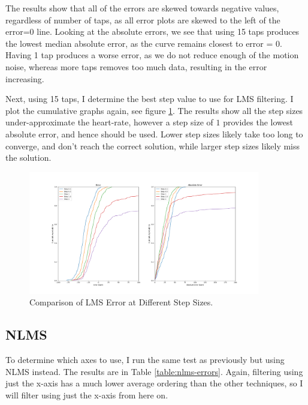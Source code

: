 \documentclass[12pt,a4paper,twoside,openright]{report}
\begin{document}
The results show that all of the errors are skewed towards negative values,
regardless of number of taps, as all error plots are skewed to the left of the error=0
line. Looking at the absolute errors, we see that
using 15 taps produces the lowest median absolute error, as the curve remains
closest to error = 0. Having 1 tap produces a worse error, as we do not reduce
enough of the motion noise, whereas more taps removes too much data, resulting
in the error increasing.

Next, using 15 taps, I determine the best step value to use for LMS filtering.
I plot the cumulative graphs again, see figure \ref{fig:lms-medium-step}. The
results show all the step sizes under-approximate the heart-rate, however a
step size of $1$ provides the lowest absolute error, and hence should be used.
Lower step sizes likely take too long to converge, and don't reach the correct
solution, while larger step sizes likely miss the solution.

\begin{figure}[H]
	\centerline{\includegraphics[width=0.9\textwidth]{figs/lms-steps-error-medium-noise.png}}
	\caption{Comparison of LMS Error at Different Step Sizes.}
	\label{fig:lms-medium-step}
\end{figure}


\subsection{NLMS}

To determine which axes to use, I run the same test as previously but using
NLMS instead. The results are in Table \ref{table:nlms-errors}. Again,
filtering using just the x-axis has a much lower average ordering than the
other techniques, so I will filter using just the x-axis from here on.
\end{document}
